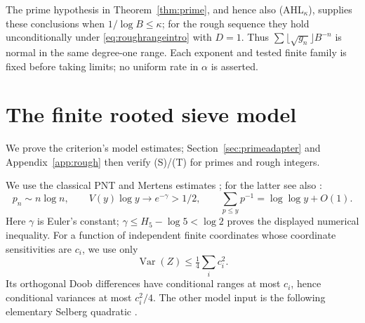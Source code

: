 \documentclass[11pt,a4paper]{article}
\begin{document}
The prime hypothesis in Theorem~\ref{thm:prime}, and hence also
\textup{(AHL$_\kappa$)}, supplies these conclusions when
$1/\log B\le\kappa$; for the rough sequence they hold unconditionally
under \eqref{eq:roughrangeintro} with $D=1$.
Thus $\sum\lfloor\sqrt{g_n}\rfloor B^{-n}$ is normal in the same
degree-one range. Each exponent and tested finite family is fixed
before taking limits; no uniform rate in $\alpha$ is asserted.

\section{The finite rooted sieve model}\label{sec:model}

We prove the criterion's model estimates; Section~\ref{sec:primeadapter}
and Appendix~\ref{app:rough} then verify (S)/(T) for primes and rough integers.

We use the classical PNT and Mertens estimates \cite{pnt,mertens};
for the latter see also \cite[Theorem 2.7(d),(e)]{montgomeryvaughan}:
\begin{equation}\label{eq:weakmertens}
 p_n\sim n\log n,\qquad V(y)\log y\longrightarrow e^{-\gamma}>1/2,
 \qquad \sum_{p\le y}p^{-1}=\log\log y+O(1).
\end{equation}
Here $\gamma$ is Euler's constant; $\gamma\le H_5-\log5<\log2$
proves the displayed numerical inequality.
For a function of independent finite coordinates whose coordinate
sensitivities are $c_i$, we use only
\[
                  \operatorname{Var}(Z)\le\tfrac14\sum_i c_i^2.
\]
Its orthogonal Doob differences have conditional ranges at most
$c_i$, hence conditional variances at most $c_i^2/4$.
The other model input is the following elementary Selberg
quadratic \cite[Section 3.2]{montgomeryvaughan}.
\end{document}

